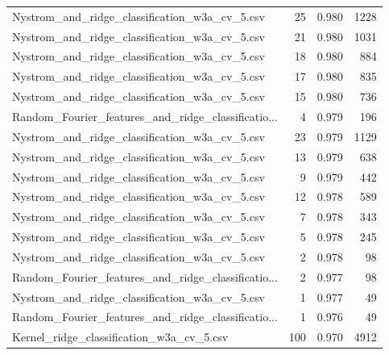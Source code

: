 \begin{tabularx}{\textwidth}{lrrr}
     Nystrom\_and\_ridge\_classification\_w3a\_cv\_5.csv &       25 &               0.980 &          1228 \\
     Nystrom\_and\_ridge\_classification\_w3a\_cv\_5.csv &       21 &               0.980 &          1031 \\
     Nystrom\_and\_ridge\_classification\_w3a\_cv\_5.csv &       18 &               0.980 &           884 \\
     Nystrom\_and\_ridge\_classification\_w3a\_cv\_5.csv &       17 &               0.980 &           835 \\
     Nystrom\_and\_ridge\_classification\_w3a\_cv\_5.csv &       15 &               0.980 &           736 \\
Random\_Fourier\_features\_and\_ridge\_classificatio... &        4 &               0.979 &           196 \\
     Nystrom\_and\_ridge\_classification\_w3a\_cv\_5.csv &       23 &               0.979 &          1129 \\
     Nystrom\_and\_ridge\_classification\_w3a\_cv\_5.csv &       13 &               0.979 &           638 \\
     Nystrom\_and\_ridge\_classification\_w3a\_cv\_5.csv &        9 &               0.979 &           442 \\
     Nystrom\_and\_ridge\_classification\_w3a\_cv\_5.csv &       12 &               0.978 &           589 \\
     Nystrom\_and\_ridge\_classification\_w3a\_cv\_5.csv &        7 &               0.978 &           343 \\
     Nystrom\_and\_ridge\_classification\_w3a\_cv\_5.csv &        5 &               0.978 &           245 \\
     Nystrom\_and\_ridge\_classification\_w3a\_cv\_5.csv &        2 &               0.978 &            98 \\
Random\_Fourier\_features\_and\_ridge\_classificatio... &        2 &               0.977 &            98 \\
     Nystrom\_and\_ridge\_classification\_w3a\_cv\_5.csv &        1 &               0.977 &            49 \\
Random\_Fourier\_features\_and\_ridge\_classificatio... &        1 &               0.976 &            49 \\
          Kernel\_ridge\_classification\_w3a\_cv\_5.csv &      100 &               0.970 &          4912 \\
\bottomrule
\end{tabularx}
